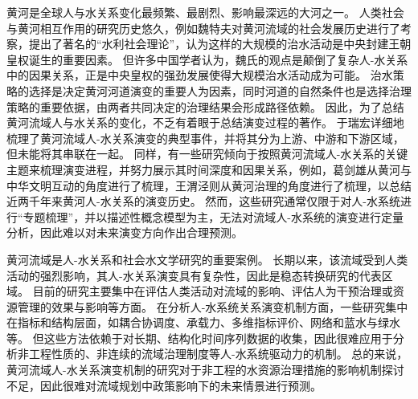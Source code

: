 
黄河是全球人与水关系变化最频繁、最剧烈、影响最深远的大河之一。
人类社会与黄河相互作用的研究历史悠久，例如魏特夫对黄河流域的社会发展历史进行了考察，提出了著名的“水利社会理论”，认为这样的大规模的治水活动是中央封建王朝皇权诞生的重要因素\cite{weitefu1989}。
但许多中国学者认为，魏氏的观点是颠倒了复杂人-水关系中的因果关系，正是中央皇权的强劲发展使得大规模治水活动成为可能\cite{jizhaoding1981}。
治水策略的选择是决定黄河河道演变的重要人为因素，同时河道的自然条件也是选择治理策略的重要依据，由两者共同决定的治理结果会形成路径依赖\cite{WangWeiJing2009}。
因此，为了总结黄河流域人与水关系的变化，不乏有着眼于总结演变过程的著作。
于瑞宏详细地梳理了黄河流域人-水关系演变的典型事件，并将其分为上游、中游和下游区域，但未能将其串联在一起\cite{yuruihong2011}。
同样，有一些研究倾向于按照黄河流域人-水关系的关键主题来梳理演变进程，并努力展示其时间深度和因果关系，例如，葛剑雄从黄河与中华文明互动的角度进行了梳理\cite{gejianxiong2020}，王渭泾则从黄河治理的角度进行了梳理\cite{WangWeiJing2009}，以总结近两千年来黄河人-水关系的演变历史。
然而，这些研究通常仅限于对人-水系统进行“专题梳理”，并以描述性概念模型为主，无法对流域人-水系统的演变进行定量分析，因此难以对未来演变方向作出合理预测。

黄河流域是人-水关系和社会水文学研究的重要案例。
长期以来，该流域受到人类活动的强烈影响，其人-水关系演变具有复杂性，因此是稳态转换研究的代表区域\cite{zuo2022, wang2014}。
目前的研究主要集中在评估人类活动对流域的影响、评估人为干预治理或资源管理的效果与影响等方面\cite{wang2016a, WuXuTong2021}。
在分析人-水系统关系演变机制方面，一些研究集中在指标和结构层面，如耦合协调度\cite{libo2022}、承载力\cite{wang2022d}、多维指标评价\cite{li2020}、网络\cite{song2022}和蓝水与绿水等\cite{zhuo2016a}。
但这些方法依赖于对长期、结构化时间序列数据的收集，因此很难应用于分析非工程性质的、非连续的流域治理制度等人-水系统驱动力的机制。
总的来说，黄河流域人-水关系演变机制的研究对于非工程的水资源治理措施的影响机制探讨不足，因此很难对流域规划中政策影响下的未来情景进行预测。

